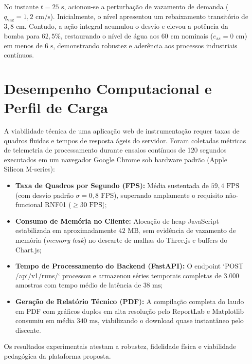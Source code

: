 No instante $t = 25\text{ s}$, acionou-se a perturbação de vazamento de demanda ($q_{\text{vaz}} = 1{,}2\text{ cm/s}$). Inicialmente, o nível apresentou um rebaixamento transitório de $3{,}8\text{ cm}$. Contudo, a ação integral acumulou o desvio e elevou a potência da bomba para $62{,}5\%$, restaurando o nível de água aos $60\text{ cm}$ nominais ($e_{ss} = 0\text{ cm}$) em menos de $6\text{ s}$, demonstrando robustez e aderência aos processos industriais contínuos.

\section{Desempenho Computacional e Perfil de Carga}
\label{sec:desempenho_computacional}

A viabilidade técnica de uma aplicação web de instrumentação requer taxas de quadros fluidas e tempos de resposta ágeis do servidor. Foram coletadas métricas de telemetria de processamento durante ensaios contínuos de 120 segundos executados em um navegador Google Chrome sob hardware padrão (Apple Silicon M-series):

\begin{itemize}
    \item \textbf{Taxa de Quadros por Segundo (FPS):} Média sustentada de $59{,}4\text{ FPS}$ (com desvio padrão $\sigma = 0{,}8\text{ FPS}$), superando amplamente o requisito não-funcional RNF01 ($\ge 30\text{ FPS}$);
    \item \textbf{Consumo de Memória no Cliente:} Alocação de heap JavaScript estabilizada em aproximadamente $42\text{ MB}$, sem evidência de vazamento de memória (\textit{memory leak}) no descarte de malhas do Three.js e buffers do Chart.js;
    \item \textbf{Tempo de Processamento do Backend (FastAPI):} O endpoint `POST /api/v1/runs/` processou e armazenou séries temporais completas de 3.000 amostras com tempo médio de latência de $38\text{ ms}$;
    \item \textbf{Geração de Relatório Técnico (PDF):} A compilação completa do laudo em PDF com gráficos duplos em alta resolução pelo ReportLab e Matplotlib consumiu em média $340\text{ ms}$, viabilizando o download quase instantâneo pelo discente.
\end{itemize}

Os resultados experimentais atestam a robustez, fidelidade física e viabilidade pedagógica da plataforma proposta.
